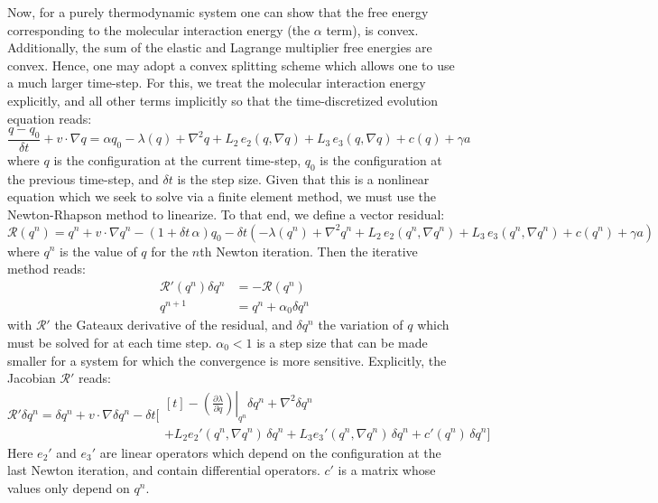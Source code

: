 \documentclass[reqno]{article}
\begin{document}
  Now, for a purely thermodynamic system one can show that the free energy
  corresponding to the molecular interaction energy (the $\alpha$ term), is
  convex.
  Additionally, the sum of the elastic and Lagrange multiplier free energies are
  convex.
  Hence, one may adopt a convex splitting scheme which allows one to use a much
  larger time-step.
  For this, we treat the molecular interaction energy explicitly, and all other
  terms implicitly so that the time-discretized evolution equation reads:
  \begin{equation}
    \frac{q - q_0}{\delta t}
    + v \cdot \nabla q
    =
    \alpha q_0
    - \lambda(q)
    + \nabla^2 q
    + L_2 \, e_2(q, \nabla q)
    + L_3 \, e_3(q, \nabla q)
    + c(q)
    + \gamma a
  \end{equation}
  where $q$ is the configuration at the current time-step, $q_0$ is the
  configuration at the previous time-step, and $\delta t$ is the step size.
  Given that this is a nonlinear equation which we seek to solve via a finite
  element method, we must use the Newton-Rhapson method to linearize.
  To that end, we define a vector residual:
  \begin{equation}
    \mathcal{R}(q^n)
    =
    q^n + v \cdot \nabla q^n
    - (1 + \delta t \, \alpha) q_0
    - 
    \delta t \left(
      -\lambda(q^n)
      + \nabla^2 q^n
      + L_2 \, e_2(q^n, \nabla q^n)
      + L_3 \, e_3(q^n, \nabla q^n)
      + c(q^n)
      + \gamma a
    \right)
  \end{equation}
  where $q^n$ is the value of $q$ for the $n$th Newton iteration.
  Then the iterative method reads:
  \begin{equation}
    \begin{split}
      \mathcal{R}'(q^n) \delta q^n &= -\mathcal{R}(q^n) \\
      q^{n + 1} &= q^n + \alpha_0 \delta q^n
    \end{split}
  \end{equation}
  with $\mathcal{R}'$ the Gateaux derivative of the residual, and $\delta q^n$
  the variation of $q$ which must be solved for at each time step.
  $\alpha_0 < 1$ is a step size that can be made smaller for a system for which
  the convergence is more sensitive.
  Explicitly, the Jacobian $\mathcal{R}'$ reads:
  \begin{equation}
    \mathcal{R}' \delta q^n
    =
      \delta q^n
      + v \cdot \nabla \delta q^n
      -\delta t \biggl[
      \begin{multlined}[t]
        - \left. \left( \frac{\partial \lambda}{\partial q} \right) \right|_{q^n} \delta q^n
        + \nabla^2 \delta q^n \\
        + L_2 e_2'(q^n, \nabla q^n) \, \delta q^n
        + L_3 e_3'(q^n, \nabla q^n) \, \delta q^n
        + c'(q^n) \, \delta q^n
      \biggr]
    \end{multlined}
  \end{equation}
  Here $e_2'$ and $e_3'$ are linear operators which depend on the configuration
  at the last Newton iteration, and contain differential operators.
  $c'$ is a matrix whose values only depend on $q^n$.
\end{document}
